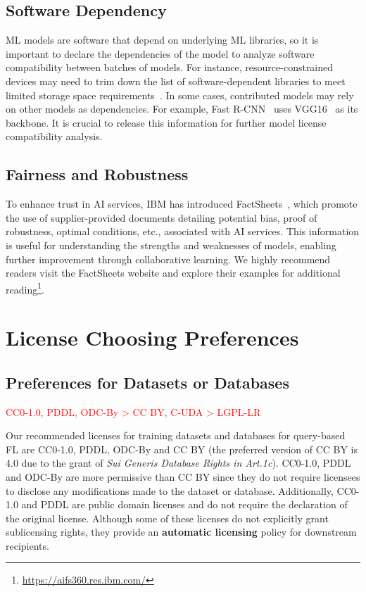 \documentclass[journal]{IEEEtran}
\begin{document}
\subsection{Software Dependency}
ML models are software that depend on underlying ML libraries, so it is important to declare the dependencies of the model to analyze software compatibility between batches of models. 
For instance, resource-constrained devices may need to trim down the list of software-dependent libraries to meet limited storage space requirements~\cite{david2021tensorflow}.
In some cases, contributed models may rely on other models as dependencies. 
For example, Fast R-CNN~\cite{girshick2015fast} uses VGG16~\cite{simonyan2014very} as its backbone. 
It is crucial to release this information for further model license compatibility analysis.

\subsection{Fairness and Robustness}
To enhance trust in AI services, IBM has introduced FactSheets~\cite{arnold2019factsheets}, which promote the use of supplier-provided documents detailing potential bias, proof of robustness, optimal conditions, etc., associated with AI services. 
This information is useful for understanding the strengths and weaknesses of models, enabling further improvement through collaborative learning. 
We highly recommend readers visit the FactSheets website and explore their examples for additional reading\footnote{\url{https://aifs360.res.ibm.com/}}.

\section{License Choosing Preferences} %
\label{apdx:preferences}
\subsection{Preferences for Datasets or Databases}

\noindent\textcolor{red}{CC0-1.0, PDDL, ODC-By > CC BY, C-UDA > LGPL-LR}
   
  Our recommended licenses for training datasets and databases for query-based FL are CC0-1.0, PDDL, ODC-By and CC BY (the preferred version of CC BY is 4.0 due to the grant of \textit{Sui Generis Database Rights in Art.1c}).
  CC0-1.0, PDDL and ODC-By are more permissive than CC BY since they do not require licensees to disclose any modifications made to the dataset or database. Additionally, CC0-1.0 and PDDL are public domain licenses and do not require the declaration of the original license.
  Although some of these licenses do not explicitly grant sublicensing rights, they provide an \textbf{automatic licensing} policy for downstream recipients.
  
\end{document}
